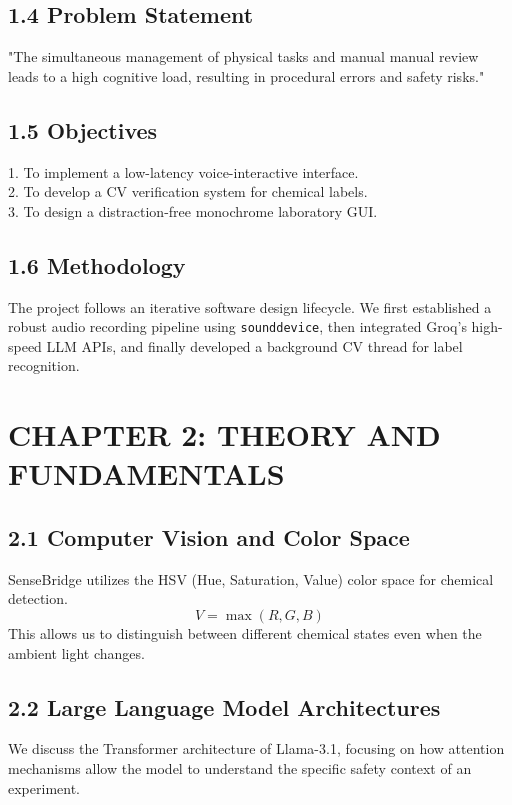 \documentclass[12pt]{article}
\begin{document}
\subsection*{1.4 Problem Statement}
"The simultaneous management of physical tasks and manual manual review leads to a high cognitive load, resulting in procedural errors and safety risks."

\subsection*{1.5 Objectives}
1. To implement a low-latency voice-interactive interface. \\
2. To develop a CV verification system for chemical labels. \\
3. To design a distraction-free monochrome laboratory GUI.

\subsection*{1.6 Methodology}
The project follows an iterative software design lifecycle. We first established a robust audio recording pipeline using \texttt{sounddevice}, then integrated Groq's high-speed LLM APIs, and finally developed a background CV thread for label recognition.

\newpage
\section*{CHAPTER 2: THEORY AND FUNDAMENTALS}

\subsection*{2.1 Computer Vision and Color Space}
SenseBridge utilizes the HSV (Hue, Saturation, Value) color space for chemical detection. 
\begin{equation}
    V = \max(R, G, B)
\end{equation}
This allows us to distinguish between different chemical states even when the ambient light changes.

\subsection*{2.2 Large Language Model Architectures}
We discuss the Transformer architecture of Llama-3.1, focusing on how attention mechanisms allow the model to understand the specific safety context of an experiment.
\end{document}
